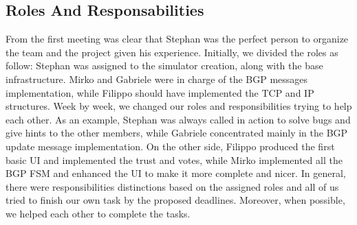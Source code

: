 \subsection{Roles And Responsabilities}
From the first meeting was clear that Stephan was the perfect person to organize the team and the project given his experience.\newline
Initially, we divided the roles as follow:
Stephan was assigned to the simulator creation, along with the base infrastructure. Mirko and Gabriele were in charge of the BGP messages implementation, while Filippo should have implemented the TCP and IP structures.\newline
Week by week, we changed our roles and responsibilities trying to help each other.\newline
As an example, Stephan was always called in action to solve bugs and give hints to the other members, while Gabriele concentrated mainly in the BGP update message implementation.\newline
On the other side, Filippo produced the first basic UI and implemented the trust and votes, while Mirko implemented all the BGP FSM and enhanced the UI to make it more complete and nicer.\newline
In general, there were responsibilities distinctions based on the assigned roles and all of us tried to finish our own task by the proposed deadlines.
Moreover, when possible, we helped each other to complete the tasks.


